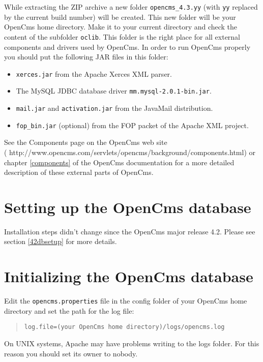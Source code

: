 While extracting the ZIP archive
a new folder \texttt{opencms\_4.3.yy} (with \texttt{yy}
replaced by the current build number) will be created. This new folder will be your OpenCms home
directory. Make it to your current directory and check the content of
the subfolder \texttt{oclib}. This folder is the right place for all external
components and drivers used by OpenCms. In order to run OpenCms properly
you should put the following JAR files in this folder:

\begin{itemize}
\item \texttt{xerces.jar} from the Apache Xerces XML parser. 
\item The MySQL JDBC database driver \texttt{mm.mysql-2.0.1-bin.jar}.
\item \texttt{mail.jar} and \texttt{activation.jar} from the JavaMail distribution.
\item \texttt{fop\_bin.jar} (optional) from the FOP packet of the Apache XML project.
\end{itemize}

See the Components page on the OpenCms web site\\
(
{http://www.opencms.com/servlets/opencms/background/components.html}) 
or chapter \ref{components} of the OpenCms documentation for a more detailed description
of these external parts of OpenCms.


\section{Setting up the OpenCms database}
Installation steps didn't change since the OpenCms major release 4.2. Please
see section \ref{42dbsetup} for more details.

\section{Initializing the OpenCms database}
Edit the \texttt{opencms.properties} file in the config folder of your OpenCms home 
directory and set the path for the log file:

\begin{quote}
\texttt{log.file=(your OpenCms home directory)/logs/opencms.log}
\end{quote}

On UNIX systems, Apache may have problems writing to the logs folder. 
For this reason you should set its owner to nobody. 

